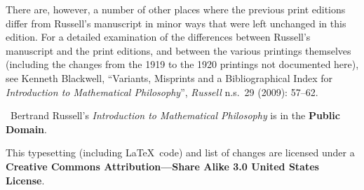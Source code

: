 \noindent There are, however, a number of other places where the previous print editions
differ from Russell's manuscript in minor ways 
that were left unchanged in this edition. For a detailed examination of the differences between Russell's 
manuscript and the print editions, and between the various printings themselves (including the changes from the 1919 to the 1920 printings not
documented here), see Kenneth Blackwell, ``Variants, Misprints and a Bibliographical Index for \textit{Introduction to Mathematical Philosophy}'', \textit{Russell} n.s.\ 29 (2009): 57--62.

\bigskip

\noindent{\Huge \copyright}\ Bertrand Russell's \textit{Introduction to Mathematical Philosophy} is in the \textbf{Public Domain}.

\noindent {}%
%
%
%
%

\bigskip

\noindent This typesetting (including \LaTeX\ code) and list of changes are licensed under a \textbf{Creative Commons Attribution---\iphoneonly{\linebreak}Share Alike 3.0 United States License}.

\noindent {}%

